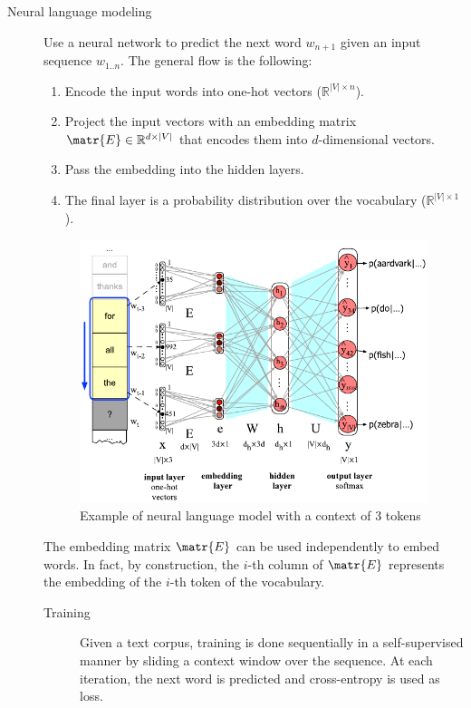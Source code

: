 \begin{description}
    \item[Neural language modeling] 
        Use a neural network to predict the next word $w_{n+1}$ given an input sequence $w_{1..n}$. The general flow is the following:
        \begin{enumerate}
            \item Encode the input words into one-hot vectors ($\mathbb{R}^{|V| \times n}$). 
            \item Project the input vectors with an embedding matrix $\matr{E} \in \mathbb{R}^{d \times |V|}$ that encodes them into $d$-dimensional vectors.
            \item Pass the embedding into the hidden layers.
            \item The final layer is a probability distribution over the vocabulary ($\mathbb{R}^{|V| \times 1}$).
        \end{enumerate}

        \begin{figure}[H]
            \centering
            \includegraphics[width=0.5\linewidth]{./img/_neural_language_model_example.pdf}
            \caption{Example of neural language model with a context of $3$ tokens}
        \end{figure}

        \begin{remark}
            The embedding matrix $\matr{E}$ can be used independently to embed words. In fact, by construction, the $i$-th column of $\matr{E}$ represents the embedding of the $i$-th token of the vocabulary.
        \end{remark}

        \begin{description}
            \item[Training] 
                Given a text corpus, training is done sequentially in a self-supervised manner by sliding a context window over the sequence. At each iteration, the next word is predicted and cross-entropy is used as loss.


\end{description}
\end{description}
